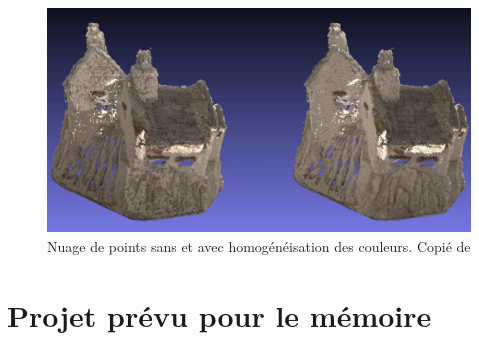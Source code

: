 \documentclass[a4paper,10pt]{scrreprt}
\begin{document}
\begin{figure}[p]
\center
\includegraphics[width=.8\textwidth]{color_correction.png}
\caption{Nuage de points sans et avec homogénéisation des couleurs. Copié de \cite{Giro2013}}
\label{fig:color_correction}
\end{figure}







\chapter{Projet prévu pour le mémoire}





\end{document}
